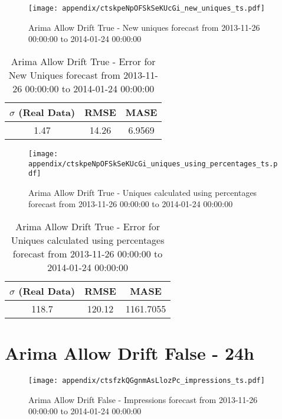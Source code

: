 \begin{figure}[H] \begin{center} \leavevmode
\texttt{[image: appendix/ctskpeNpOFSkSeKUcGi\_new\_uniques\_ts.pdf]} \caption{
Arima Allow Drift True - New uniques forecast from 2013-11-26 00:00:00 to 2014-01-24 00:00:00} \label{fig:appendix/ctskpeNpOFSkSeKUcGi_new_uniques_ts.pdf} \end{center}
\end{figure}

\begin{table}[H]
\centering
\footnotesize
\begin{tabular}{ccc}
$\sigma$ (Real Data) & RMSE & MASE   \\ \hline
1.47 & 14.26 & 6.9569 \\
\end{tabular}

\vspace{0.5cm}

\caption{
Arima Allow Drift True - Error for New Uniques forecast from 2013-11-26 00:00:00 to 2014-01-24 00:00:00}
\end{table}

\begin{figure}[H] \begin{center} \leavevmode
\texttt{[image: appendix/ctskpeNpOFSkSeKUcGi\_uniques\_using\_percentages\_ts.pdf]} \caption{
Arima Allow Drift True - Uniques calculated using percentages forecast from 2013-11-26 00:00:00 to 2014-01-24 00:00:00} \label{fig:appendix/ctskpeNpOFSkSeKUcGi_uniques_using_percentages_ts.pdf} \end{center}
\end{figure}

\begin{table}[H]
\centering
\footnotesize
\begin{tabular}{ccc}
$\sigma$ (Real Data) & RMSE & MASE   \\ \hline
118.7 & 120.12 & 1161.7055 \\
\end{tabular}

\vspace{0.5cm}

\caption{
Arima Allow Drift True - Error for Uniques calculated using percentages forecast from 2013-11-26 00:00:00 to 2014-01-24 00:00:00}
\end{table}

\section{Arima Allow Drift False - 24h}
\begin{figure}[H] \begin{center} \leavevmode
\texttt{[image: appendix/ctsfzkQGgnmAsLlozPc\_impressions\_ts.pdf]} \caption{
Arima Allow Drift False - Impressions forecast from 2013-11-26 00:00:00 to 2014-01-24 00:00:00} \label{fig:appendix/ctsfzkQGgnmAsLlozPc_impressions_ts.pdf} \end{center}
\end{figure}

